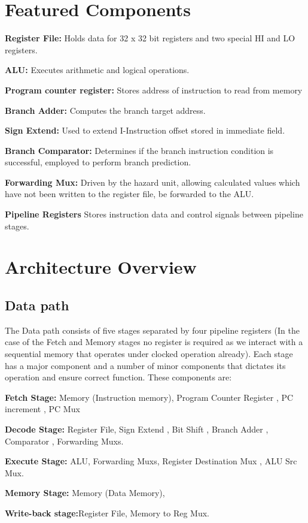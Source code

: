 \documentclass[10pt]{datasheet}
\begin{document}
\section{Featured Components}
\textbf{Register File:} Holds data for 32 x 32 bit registers and two special HI and LO registers.

\textbf{ALU:} Executes arithmetic and logical operations.

\textbf{Program counter register:} Stores address of instruction to read from memory

\textbf{Branch Adder:} Computes the branch target address.

\textbf{Sign Extend:} Used to extend I-Instruction offset stored in immediate field. 

\textbf{Branch Comparator:} Determines if the branch instruction condition is successful, employed to perform branch prediction.

\textbf{Forwarding Mux:} Driven by the hazard unit, allowing calculated values which have not been written to the register file, be forwarded to the ALU.

{\textbf{Pipeline Registers}} Stores instruction data and control signals between pipeline stages.

\newpage

\onecolumn

\section{Architecture Overview}

\subsection{Data path}
The Data path consists of five stages separated by four pipeline registers (In the case of the Fetch and Memory stages no register is required as we interact with a sequential memory that operates under clocked operation already). Each stage has a major component and a number of minor components that dictates its operation and ensure correct function. These components are:

\begin{multicols}{2}

\textbf{Fetch Stage:} Memory (Instruction memory), Program Counter Register , PC increment , PC Mux 

\textbf{Decode Stage:} Register File, Sign Extend , Bit Shift , Branch Adder , Comparator , Forwarding Muxs.

\textbf{Execute Stage:} ALU, Forwarding Muxs, Register Destination Mux , ALU Src Mux.

\textbf{Memory Stage:} Memory (Data Memory),

\textbf{Write-back stage:}Register File, Memory to Reg Mux.

\end{multicols}
\end{document}
